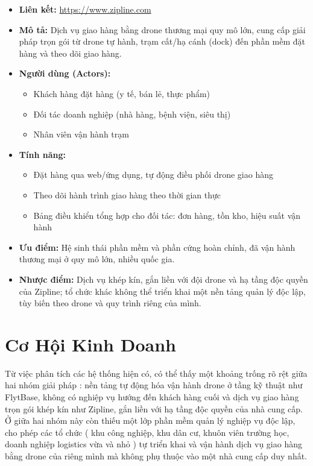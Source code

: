 \begin{itemize}
  \item \textbf{Liên kết:} \url{https://www.zipline.com}
  \item \textbf{Mô tả:} Dịch vụ giao hàng bằng drone thương mại quy mô lớn, cung cấp giải pháp trọn gói từ drone tự hành, trạm cất/hạ cánh (dock) đến phần mềm đặt hàng và theo dõi giao hàng.
  \item \textbf{Người dùng (Actors):}
    \begin{itemize}
      \item Khách hàng đặt hàng (y tế, bán lẻ, thực phẩm)
      \item Đối tác doanh nghiệp (nhà hàng, bệnh viện, siêu thị)
      \item Nhân viên vận hành trạm
    \end{itemize}
  \item \textbf{Tính năng:}
    \begin{itemize}
      \item Đặt hàng qua web/ứng dụng, tự động điều phối drone giao hàng
      \item Theo dõi hành trình giao hàng theo thời gian thực
      \item Bảng điều khiển tổng hợp cho đối tác: đơn hàng, tồn kho, hiệu suất vận hành
    \end{itemize}
  \item \textbf{Ưu điểm:} Hệ sinh thái phần mềm và phần cứng hoàn chỉnh, đã vận hành thương mại ở quy mô lớn, nhiều quốc gia.
  \item \textbf{Nhược điểm:} Dịch vụ khép kín, gắn liền với đội drone và hạ tầng độc quyền của Zipline; tổ chức khác không thể triển khai một nền tảng quản lý độc lập, tùy biến theo drone và quy trình riêng của mình.
\end{itemize}

\section{Cơ Hội Kinh Doanh}

Từ việc phân tích các hệ thống hiện có, có thể thấy một khoảng trống rõ rệt giữa hai nhóm giải pháp : nền tảng tự động hóa vận hành drone ở tầng kỹ thuật như FlytBase, không có nghiệp vụ hướng đến khách hàng cuối và dịch vụ giao hàng trọn gói khép kín như Zipline, gắn liền với hạ tầng độc quyền của nhà cung cấp. Ở giữa hai nhóm này còn thiếu một lớp phần mềm quản lý nghiệp vụ độc lập, cho phép các tổ chức ( khu công nghiệp, khu dân cư, khuôn viên trường học, doanh nghiệp logistics vừa và nhỏ ) tự triển khai và vận hành dịch vụ giao hàng bằng drone của riêng mình mà không phụ thuộc vào một nhà cung cấp duy nhất.

